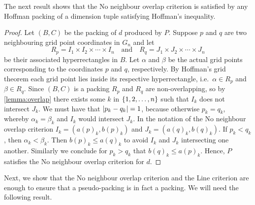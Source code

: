 \noindent The next result shows that the No neighbour overlap criterion  is satisfied by any Hoffman packing of a dimension tuple satisfying Hoffman's inequality.

\begin{proof}
Let $(B, C)$ be the packing of $d$ produced by $P$. Suppose $p$ and $q$ are two neighbouring grid point coordinates in $G_n$ and let
\[
R_p = I_1 \times I_2 \times \dotsb \times I_n \quad \text{and} \quad
R_q = J_1 \times J_2 \times \dotsb \times J_n
\]
be their associated hyperrectangles in $B$. Let $\alpha$ and $\beta$ be the actual grid points corresponding to the coordinates $p$ and $q$, respectively. By Hoffman's grid theorem  each grid point lies inside its respective hyperrectangle, i.e.\ $\alpha \in R_p$ and $\beta \in R_q$. Since $(B, C)$ is a packing $R_p$ and $R_q$ are non-overlapping, so by \cref{lemma:overlap} there exists some $k$ in $\left\{ 1, 2, \dotsc, n \right\}$ such that $I_k$ does not intersect $J_k$. We must have that $\lvert p_k - q_k\rvert = 1$, because otherwise $p_k = q_k$, whereby $\alpha_k = \beta_k$ and $I_k$ would intersect $J_k$. In the notation of the No neighbour overlap criterion  $I_k = (a(p)_k, b(p)_k)$ and $J_k = (a(q)_k, b(q)_k)$. If $p_k < q_k$, then $\alpha_k < \beta_k$. Then $b(p)_k \leq a(q)_k$ to avoid $I_k$ and $J_k$ intersecting one another. Similarly we conclude for $p_k > q_k$ that $b(q)_k \leq a(p)_k$. Hence, $P$ satisfies the No neighbour overlap criterion  for $d$.
\end{proof}

\noindent Next, we show that the No neighbour overlap criterion  and the Line criterion  are enough to ensure that a pseudo-packing is in fact a packing. We will need the following result.

